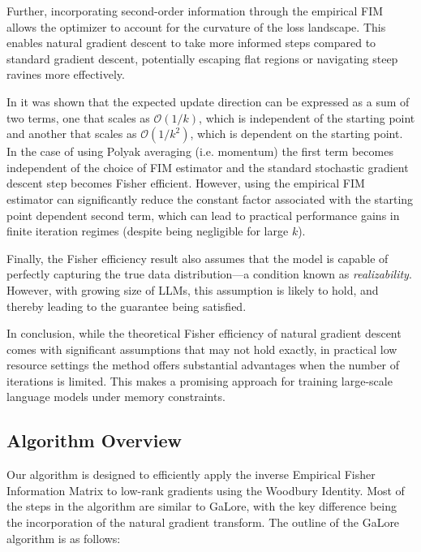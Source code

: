 Further, incorporating second-order information through the empirical FIM allows the optimizer to account for the curvature of the loss landscape. This enables natural gradient descent to take more informed steps compared to standard gradient descent, potentially escaping flat regions or navigating steep ravines more effectively.

In \citep{martens2020new} it was shown that the expected update direction can be expressed as a sum of two terms, one that scales as \(\mathcal{O}(1/k)\), which is independent of the starting point and another that scales as \(\mathcal{O}(1/k^2)\), which is dependent on the starting point. In the case of using Polyak averaging (i.e. momentum) the first term becomes independent of the choice of FIM estimator and the standard stochastic gradient descent step becomes Fisher efficient. However, using the empirical FIM estimator can significantly reduce the constant factor associated with the starting point dependent second term, which can lead to practical performance gains in finite iteration regimes (despite being negligible for large \(k\)).

Finally, the Fisher efficiency result also assumes that the model is capable of perfectly capturing the true data distribution—a condition known as \emph{realizability}. However, with growing size of LLMs, this assumption is likely to hold, and thereby leading to the guarantee being satisfied.

In conclusion, while the theoretical Fisher efficiency of natural gradient descent comes with significant assumptions that may not hold exactly, in practical low resource settings the method offers substantial advantages when the number of iterations is limited. This makes \lowrank{} a promising approach for training large-scale language models under memory constraints.

\subsection{Algorithm Overview}

Our \lowrank{} algorithm is designed to efficiently apply the inverse Empirical Fisher Information Matrix to low-rank gradients using the Woodbury Identity. Most of the steps in the algorithm are similar to GaLore, with the key difference being the incorporation of the natural gradient transform. The outline of the GaLore algorithm is as follows:

% 

